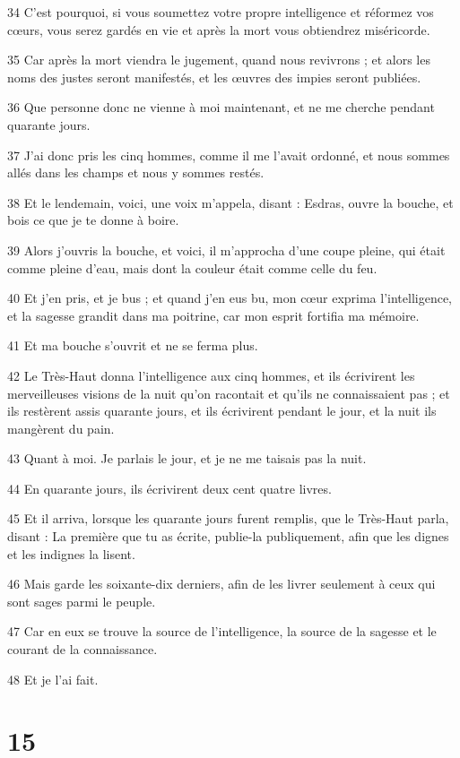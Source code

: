 \par 34 C'est pourquoi, si vous soumettez votre propre intelligence et réformez vos cœurs, vous serez gardés en vie et après la mort vous obtiendrez miséricorde.
\par 35 Car après la mort viendra le jugement, quand nous revivrons ; et alors les noms des justes seront manifestés, et les œuvres des impies seront publiées.
\par 36 Que personne donc ne vienne à moi maintenant, et ne me cherche pendant quarante jours.
\par 37 J'ai donc pris les cinq hommes, comme il me l'avait ordonné, et nous sommes allés dans les champs et nous y sommes restés.
\par 38 Et le lendemain, voici, une voix m'appela, disant : Esdras, ouvre la bouche, et bois ce que je te donne à boire.
\par 39 Alors j'ouvris la bouche, et voici, il m'approcha d'une coupe pleine, qui était comme pleine d'eau, mais dont la couleur était comme celle du feu.
\par 40 Et j'en pris, et je bus ; et quand j'en eus bu, mon cœur exprima l'intelligence, et la sagesse grandit dans ma poitrine, car mon esprit fortifia ma mémoire.
\par 41 Et ma bouche s'ouvrit et ne se ferma plus.
\par 42 Le Très-Haut donna l'intelligence aux cinq hommes, et ils écrivirent les merveilleuses visions de la nuit qu'on racontait et qu'ils ne connaissaient pas ; et ils restèrent assis quarante jours, et ils écrivirent pendant le jour, et la nuit ils mangèrent du pain.
\par 43 Quant à moi. Je parlais le jour, et je ne me taisais pas la nuit.
\par 44 En quarante jours, ils écrivirent deux cent quatre livres.
\par 45 Et il arriva, lorsque les quarante jours furent remplis, que le Très-Haut parla, disant : La première que tu as écrite, publie-la publiquement, afin que les dignes et les indignes la lisent.
\par 46 Mais garde les soixante-dix derniers, afin de les livrer seulement à ceux qui sont sages parmi le peuple.
\par 47 Car en eux se trouve la source de l'intelligence, la source de la sagesse et le courant de la connaissance.
\par 48 Et je l'ai fait.

\chapter{15}

